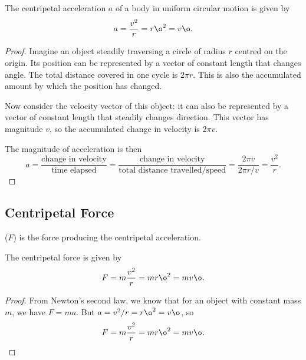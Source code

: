 \begin{proposition}
    The centripetal acceleration $a$ of a body in uniform circular motion is given by \[a = \frac{v^2}{r} = r\o^2 = v\o.\]
\end{proposition}
\begin{proof}
    Imagine an object steadily traversing a circle of radius $r$ centred on the origin. Its position can be represented by a vector of constant length that changes angle. The total distance covered in one cycle is $2\pi r$. This is also the accumulated amount by which the position has changed.

    Now consider the velocity vector of this object: it can also be represented by a vector of constant length that steadily changes direction. This vector has magnitude $v$, so the accumulated change in velocity is $2\pi v$.

    The magnitude of acceleration is then \[a = \frac{\text{change in velocity}}{\text{time elapsed}} = \frac{\text{change in velocity}}{\text{total distance travelled} / \text{speed}} = \frac{2\pi v}{2\pi r / v} = \frac{v^2}{r}.\]
\end{proof}

\subsection{Centripetal Force}

\begin{definition}
     ($F$) is the force producing the centripetal acceleration.
\end{definition}

\begin{proposition}
    The centripetal force is given by \[F = m \frac{v^2}{r} = m r \o^2 = m v \o.\]
\end{proposition}
\begin{proof}
    From Newton's second law, we know that for an object with constant mass $m$, we have $F = ma$. But $a = v^2/r = r\o^2 = v\o$, so \[F = m \frac{v^2}{r} = m r \o^2 = m v \o.\]
\end{proof}
